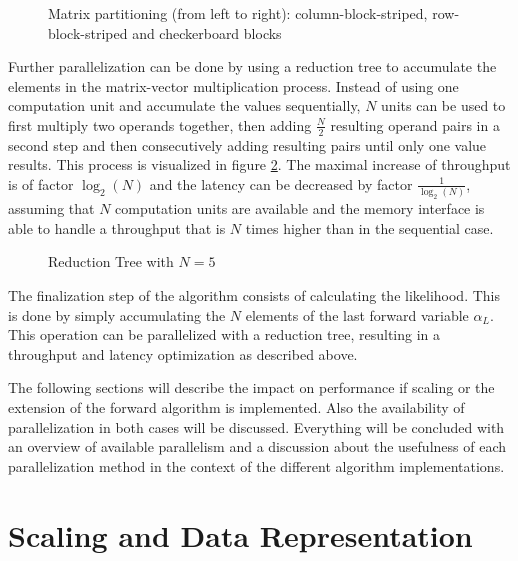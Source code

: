 \documentclass[mscthesis]{usiinfthesis}
\begin{document}
\begin{figure}
    \centering
    
    \caption{Matrix partitioning (from left to right): column-block-striped,
        row-block-striped and checkerboard blocks}
    \label{fig:matrix_partitioning}
\end{figure}

Further parallelization can be done by using a reduction tree to accumulate the
elements in the matrix-vector multiplication process. Instead of using one
computation unit and accumulate the values sequentially, $N$ units can be used
to first multiply two operands together, then adding $\frac{N}{2}$ resulting
operand pairs in a second step and then consecutively adding resulting pairs
until only one value results. This process is visualized in figure
\ref{fig:red_tree}. The maximal increase of throughput is of factor $\log_2(N)$
and the latency can be decreased by factor $\frac{1}{\log_2(N)}$, assuming that
$N$ computation units are available and the memory interface is able to handle
a throughput that is $N$ times higher than in the sequential case.

\begin{figure}
    \centering
    
    \caption{Reduction Tree with $N=5$}
    \label{fig:red_tree}
\end{figure}

The finalization step of the algorithm consists of calculating the likelihood.
This is done by simply accumulating the $N$ elements of the last forward
variable $\alpha_L$. This operation can be parallelized with a reduction tree,
resulting in a throughput and latency optimization as described above.

The following sections will describe the impact on performance if scaling or
the extension of the forward algorithm is implemented. Also the availability of
parallelization in both cases will be discussed. Everything will be concluded
with an overview of available parallelism and a discussion about the usefulness
of each parallelization method in the context of the different algorithm
implementations.

\section{Scaling and Data Representation}
\label{ch:analysis_scaling}
\end{document}
